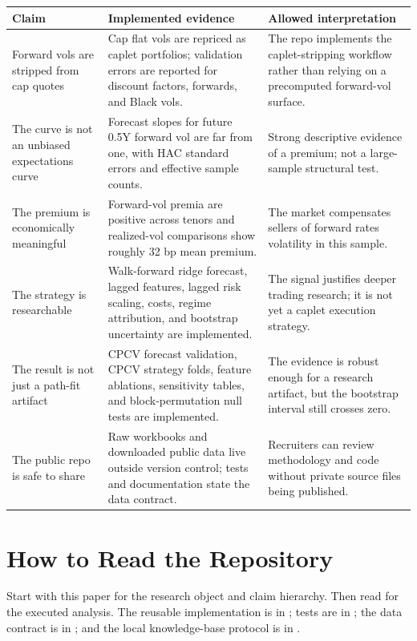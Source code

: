\documentclass[12pt]{article}
\begin{document}
\begin{center}
\small
\begin{tabular}{L{0.24\textwidth}L{0.31\textwidth}L{0.34\textwidth}}
\toprule
Claim & Implemented evidence & Allowed interpretation \\
\midrule
Forward vols are stripped from cap quotes &
Cap flat vols are repriced as caplet portfolios; validation errors are reported for discount factors,
forwards, and Black vols. &
The repo implements the caplet-stripping workflow rather than relying on a precomputed
forward-vol surface. \\
\addlinespace
The curve is not an unbiased expectations curve &
Forecast slopes for future 0.5Y forward vol are far from one, with HAC standard errors and
effective sample counts. &
Strong descriptive evidence of a premium; not a large-sample structural test. \\
\addlinespace
The premium is economically meaningful &
Forward-vol premia are positive across tenors and realized-vol comparisons show roughly 32 bp
mean premium. &
The market compensates sellers of forward rates volatility in this sample. \\
\addlinespace
The strategy is researchable &
Walk-forward ridge forecast, lagged features, lagged risk scaling, costs, regime attribution, and
bootstrap uncertainty are implemented. &
The signal justifies deeper trading research; it is not yet a caplet execution strategy. \\
\addlinespace
The result is not just a path-fit artifact &
CPCV forecast validation, CPCV strategy folds, feature ablations, sensitivity tables, and
block-permutation null tests are implemented. &
The evidence is robust enough for a research artifact, but the bootstrap interval still crosses zero. \\
\addlinespace
The public repo is safe to share &
Raw workbooks and downloaded public data live outside version control; tests and documentation
state the data contract. &
Recruiters can review methodology and code without private source files being published. \\
\bottomrule
\end{tabular}
\end{center}

\section{How to Read the Repository}

Start with this paper for the research object and claim hierarchy. Then read
 for the executed analysis. The reusable
implementation is in ; tests are in
; the data contract is in ; and
the local knowledge-base protocol is in .
\end{document}
